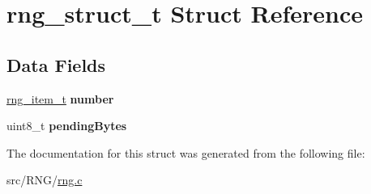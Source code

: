 \hypertarget{structrng__struct__t}{}\section{rng\+\_\+struct\+\_\+t Struct Reference}
\label{structrng__struct__t}
\subsection*{Data Fields}
\begin{DoxyCompactItemize}
\item 
\hyperlink{unionrng__item__t}{rng\+\_\+item\+\_\+t} {\bfseries number}\hypertarget{structrng__struct__t_ad309d315440c0731320ad5553e2da8ad}{}\label{structrng__struct__t_ad309d315440c0731320ad5553e2da8ad}

\item 
uint8\+\_\+t {\bfseries pending\+Bytes}\hypertarget{structrng__struct__t_ad3fc86eed7688298fb970c3dc3e330fe}{}\label{structrng__struct__t_ad3fc86eed7688298fb970c3dc3e330fe}

\end{DoxyCompactItemize}


The documentation for this struct was generated from the following file\+:\begin{DoxyCompactItemize}
\item 
src/\+R\+N\+G/\hyperlink{rng_8c}{rng.\+c}\end{DoxyCompactItemize}
